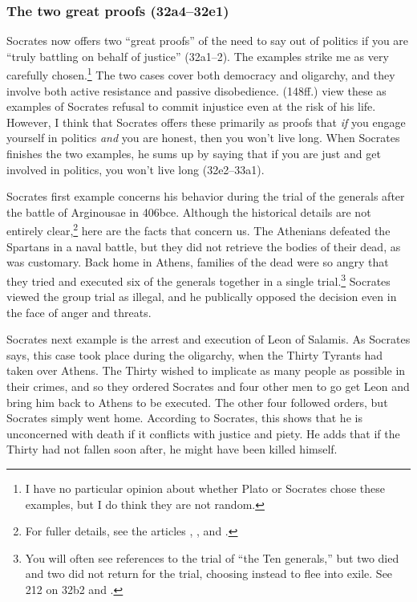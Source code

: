 \documentclass[11pt]{article}
\begin{document}
\subsubsection{The two great proofs (32a4--32e1)}

Socrates now offers two ``great proofs'' of the need to say out of politics if you are ``truly battling on behalf of justice'' (32a1--2).  The examples strike me as very carefully chosen.\footnote{I have no particular opinion about whether Plato or Socrates chose these examples, but I do think they are not random.}  The two cases cover both democracy and oligarchy, and they involve both active resistance and passive disobedience.  \citet{brickhousesmith2004} (148ff.) view these as examples of Socrates refusal to commit injustice even at the risk of his life.  However, I think that Socrates offers these primarily as proofs that \emph{if} you engage yourself in politics \emph{and} you are honest, then you won't live long.  When Socrates finishes the two examples, he sums up by saying that if you are just and get involved in politics, you won't live long (32e2--33a1).

Socrates first example concerns his behavior during the trial of the generals after the battle of Arginousae in 406bce.  Although the historical details are not entirely clear,\footnote{For fuller details, see the articles \citet{andrewes1974}, \citet{lang1990}, and \citet{lang1992}.} here are the facts that concern us.  The Athenians defeated the Spartans in a naval battle, but they did not retrieve the bodies of their dead, as was customary.  Back home in Athens, families of the dead were so angry that they tried and executed six of the generals together in a single trial.\footnote{You will often see references to the trial of ``the Ten generals,'' but two died and two did not return for the trial, choosing instead to flee into exile.  See \citet{burnet1924} 212 on 32b2 and \citet{lang1992}.}  Socrates viewed the group trial as illegal, and he publically opposed the decision even in the face of anger and threats.

Socrates next example is the arrest and execution of Leon of Salamis.  As Socrates says, this case took place during the oligarchy, when the Thirty Tyrants had taken over Athens.  The Thirty wished to implicate as many people as possible in their crimes, and so they ordered Socrates and four other men to go get Leon and bring him back to Athens to be executed.  The other four followed orders, but Socrates simply went home.  According to Socrates, this shows that he is unconcerned with death if it conflicts with justice and piety.  He adds that if the Thirty had not fallen soon after, he might have been killed himself.
\end{document}
